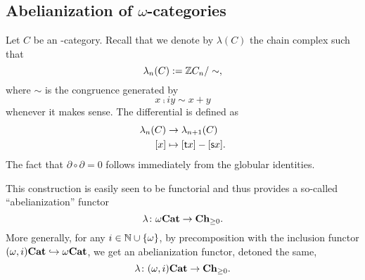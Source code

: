 \documentclass{amsart}
\renewcommand{\sce}[1]{\source{} #1}
\renewcommand{\tge}[1]{\target{} #1}
\newcommand{\Ni}{\N\cup\set{\omega}} %
\begin{document}
\subsection{Abelianization of $\omega$-categories}
\begin{paragr}
  Let $C$ be an \oo\nbd-category. Recall that we denote by
  $\lambda(C)$ the chain complex such that
  \[
    \lambda_n(C):=\mathbb Z C_n/\sim,
  \]
  where $\sim$ is the congruence generated by
  \[
    x \comp{i} y \sim x + y
  \]
  whenever it makes sense. The differential is defined as
  \[
    \begin{aligned}
      \lambda_{n}(C) &\to \lambda_{n+1}(C)\\
      [x] &\mapsto [\tge{x}]-[\sce{x}].
    \end{aligned}
  \]
  The fact that $\partial \circ \partial=0$ follows immediately from
  the globular identities.

  This construction is easily seen to be functorial and thus provides
  a so-called ``abelianization'' functor
  \[
    \lambda \colon {\omega}\mathbf{Cat} \to \mathbf{Ch}_{\geq 0}.
  \]
  More generally, for any $i \in \Ni$, by precomposition with the
  inclusion functor $(\omega,i)\mathbf{Cat}\hookrightarrow {\omega}\mathbf{Cat}$, we get an
  abelianization functor, detoned the same,
  \[
    \lambda \colon (\omega,i)\mathbf{Cat} \to \mathbf{Ch}_{\geq 0}.
  \]
\end{paragr}
\end{document}
